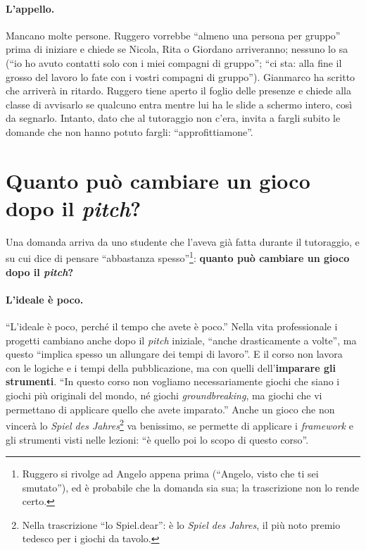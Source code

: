 \paragraph{L'appello.} Mancano molte persone. Ruggero vorrebbe ``almeno una persona per
gruppo'' prima di iniziare e chiede se Nicola, Rita o Giordano arriveranno; nessuno lo
sa (``io ho avuto contatti solo con i miei compagni di gruppo''; ``ci sta: alla fine il
grosso del lavoro lo fate con i vostri compagni di gruppo''). Gianmarco ha scritto che
arriverà in ritardo. Ruggero tiene aperto il foglio delle presenze e chiede alla classe
di avvisarlo se qualcuno entra mentre lui ha le slide a schermo intero, così da segnarlo.
Intanto, dato che al tutoraggio non c'era, invita a fargli subito le domande che non
hanno potuto fargli: ``approfittiamone''.

\section{Quanto può cambiare un gioco dopo il \emph{pitch}?}
\label{a12:sec:cambiare}

Una domanda arriva da uno studente che l'aveva già fatta durante il tutoraggio, e su cui
dice di pensare ``abbastanza spesso''\footnote{Ruggero si rivolge ad Angelo appena
prima (``Angelo, visto che ti sei smutato''), ed è probabile che la domanda sia sua; la
trascrizione non lo rende certo.}: \textbf{quanto può cambiare un gioco dopo il
\emph{pitch}?}

\paragraph{L'ideale è poco.} ``L'ideale è poco, perché il tempo che avete è poco.''
Nella vita professionale i progetti cambiano anche dopo il \emph{pitch} iniziale, ``anche
drasticamente a volte'', ma questo ``implica spesso un allungare dei tempi di lavoro''.
E il corso non lavora con le logiche e i tempi della pubblicazione, ma con quelli
dell'\textbf{imparare gli strumenti}. ``In questo corso non vogliamo necessariamente
giochi che siano i giochi più originali del mondo, né giochi \emph{groundbreaking}, ma
giochi che vi permettano di applicare quello che avete imparato.'' Anche un gioco che
non vincerà lo \emph{Spiel des Jahres}\footnote{Nella trascrizione ``lo Spiel.dear'':
è lo \emph{Spiel des Jahres}, il più noto premio tedesco per i giochi da tavolo.} va
benissimo, se permette di applicare i \emph{framework} e gli strumenti visti nelle
lezioni: ``è quello poi lo scopo di questo corso''.

